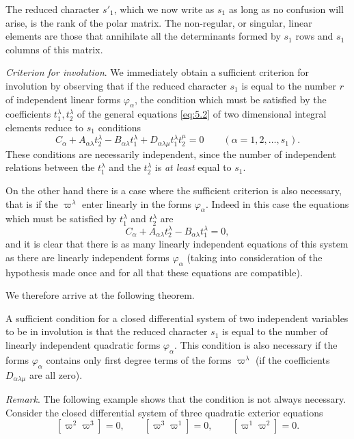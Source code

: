 The reduced character $s'_{1}$, which we now write as $s_{1}$ as long as no confusion will arise, is the rank of the polar matrix. The non-regular, or singular, linear elements are those that annihilate all the determinants formed by $s_{1}$ rows and $s_{1}$ columns of this matrix.

\vspace{12pt}\fsec \emph{Criterion for involution}. We immediately obtain a sufficient criterion for involution by observing that if the reduced character $s_{1}$ is equal to the number $r$ of independent linear  forms $\varphi_{\alpha}$, the condition which must be satisfied by the coefficients $t_{1}^{\lambda},t_{2}^{\lambda}$ of the general equations \eqref{eq:5.2} of two dimensional integral elements reduce to $s_{1}$ conditions
\[
C_{\alpha}+A_{\alpha\lambda}t_{2}^{\lambda}-B_{\alpha\lambda}t_{1}^{\lambda}+D_{\alpha\lambda\mu}t_{1}^{\lambda}t_{2}^{\mu}=0\qquad(\alpha=1,2,\dots,s_{1}).
\]
These conditions are necessarily independent, since the number of independent relations between the $t_{1}^{\lambda}$ and the $t_{2}^{\lambda}$ is \emph{at least} equal to $s_{1}$.

On the other hand there is a case where the sufficient criterion is also necessary, that is if the $\varpi^{\lambda}$ enter linearly  in the forms $\varphi_{\alpha}$. Indeed in this case the equations which must be satisfied by $t_{1}^{\lambda}$ and $t_{2}^{\lambda}$ are
\[
C_{\alpha}+A_{\alpha\lambda}t_{2}^{\lambda}-B_{\alpha\lambda}t_{1}^{\lambda}=0,
\]
and it is clear that there is as many linearly independent equations of this system as there are linearly independent forms $\varphi_{\alpha}$ (taking into consideration of the hypothesis made once and for all that these equations are compatible).

We therefore arrive at the following theorem.
\begin{thm*}
  A sufficient condition for a closed differential system of two independent variables to be in involution is that the reduced character $s_{1}$ is equal to the number of linearly independent quadratic forms $\varphi_{\alpha}$. This condition is also necessary if the forms $\varphi_{\alpha}$ contains only first degree terms of the forms $\varpi^{\lambda}$ (if the coefficients $D_{\alpha\lambda\mu}$ are all zero).
\end{thm*}

\vspace{12pt}\fsec \emph{Remark}. The following example shows that the condition is not always necessary. Consider the closed differential system of three quadratic exterior equations
\[
[\varpi^{2}\varpi^{3}]=0,\qquad[\varpi^{3}\varpi^{1}]=0,\qquad [\varpi^{1}\varpi^{2}]=0.
\]

